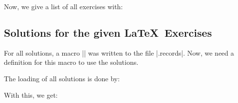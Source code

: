 \begin{dispListing}
\tcbstoprecording
\end{dispListing}
\tcbusetemp

\bigskip

Now, we give a list of all exercises with:

\begin{dispListing}
\end{dispListing}
\tcbusetemp

\clearpage
\subsection{Solutions for the given \LaTeX\ Exercises}

For all solutions, a macro |\processsol| was written to the file |\jobname.records|.
Now, we need a definition for this macro to use the solutions.

\tcbusetemp

The loading of all solutions is done by:

\begin{dispListing}
\tcbinputrecords
\end{dispListing}

With this, we get:

\tcbusetemp



